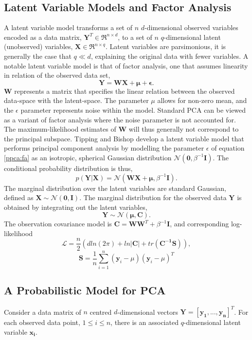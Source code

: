 \documentclass[ %
author={Dillon Keith Diep [INCOMPLETE DRAFT, NOT FOR SUBMISSION]},
supervisor={Dr. Carl Henrik Ek},
degree={MEng},
title={ARt-CG:},
subtitle={Assisted Real-time Content Generation of 3D Hair by Learning Manifolds},
type={Research},
year={2014} ]{dissertation}
\begin{document}
	\subsection{Latent Variable Models and Factor Analysis}
	A latent variable model transforms a set of $n$ $d$-dimensional observed variables encoded as a data matrix, $\bm{Y}^T\in\Re^{n \times d}$, to a set of $n$ $q$-dimensional latent (unobserved) variables, $\bm{X}\in\Re^{n \times q}$. Latent variables are parsimonious, it is generally the case that $q \ll d$, explaining the original data with fewer variables. A notable latent variable model is that of factor analysis, one that assumes linearity in relation of the observed data set,
	\begin{equation} \label{ppca:fa}
	\bm{Y=WX+\mu+\epsilon}.
	\end{equation}
	$\bm{W}$ represents a matrix that specifies the linear relation between the observed data-space with the latent-space.
	The parameter $\mu$ allows for non-zero mean, and the $\epsilon$ parameter represents noise within the model. Standard PCA can be viewed as a variant of factor analysis where the noise parameter is not accounted for. The maximum-likelihood estimates of $\bm{W}$ will thus generally not correspond to the principal subspace. Tipping and Bishop develop a latent variable model that performs principal component analysis by modelling the parameter $\epsilon$ of equation \ref{ppca:fa} as an isotropic, spherical Gaussian distribution $\mathcal{N}(\bm{0},\beta^{-1}\bm{I})$. The conditional probability distribution is thus,
	\begin{equation} \label{ppca:conditional}
	p(\bm{Y|X})=\mathcal{N}(\bm{WX+\mu},\beta^{-1}\bm{I}). 
	\end{equation}
	The marginal distribution over the latent variables are standard Gaussian, defined as $\bm{X\sim\mathcal{N}(0,I)}$. The marginal distribution for the observed data $\bm{Y}$ is obtained by integrating out the latent variables,
	$$\bm{Y}\sim\mathcal{N}\bm{(\mu,C)}.$$
	The observation covariance model is $\bm{C=WW}^T+\beta^{-1}\bm{I}$, and corresponding log-likelihood
	\begin{equation} \label{ppca:loglikelihood}
	\mathcal{L}=\frac{n}{2}(d ln(2\pi)+ln|\bm{C}|+tr(\bm{C^{-1}S})),
	\end{equation}
	$$\bm{S}=\frac{1}{n}\sum^n_{i=1}(\bm{y}_i-\mu)(\bm{y}_i-\mu)^T$$
	
	\subsection{A Probabilistic Model for PCA}
	Consider a data matrix of $n$ centred $d$-dimensional vectors $\bm{Y=[y_1,...,y_n]}^T$.
	For each observed data point, $1 \leq i \leq n $, there is an associated $q$-dimensional latent variable $\bm{x_i}$.
	
\end{document}
